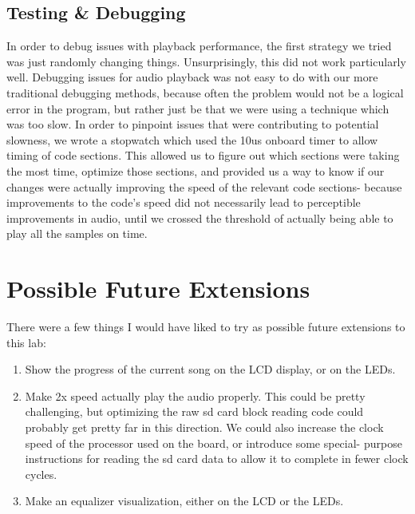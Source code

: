 \documentclass[12pt]{article}
\begin{document}
\subsection{Testing \& Debugging}
In order to debug issues with playback performance, the first strategy we
tried was just randomly changing things. Unsurprisingly, this did not work
particularly well. Debugging issues for audio playback was not easy to do
with our more traditional debugging methods, because often the problem would
not be a logical error in the program, but rather just be
that we were using a technique which was too slow. In order to pinpoint issues
that were contributing to potential slowness, we wrote a stopwatch which used
the 10us onboard timer to allow timing of code sections. This allowed us to
figure out which sections were taking the most time, optimize those sections,
and provided us a way to know if our changes were actually improving the speed
of the relevant code sections- because improvements to the code's speed did
not necessarily lead to perceptible improvements in audio, until we crossed
the threshold of actually being able to play all the samples on time.

\section{Possible Future Extensions}
There were a few things I would have liked to try as possible future extensions
to this lab:
\begin{enumerate}
\item Show the progress of the current song on the LCD display, or on the LEDs.
\item Make 2x speed actually play the audio properly. This could be pretty
	challenging, but optimizing the raw sd card block reading code could
	probably get pretty far in this direction. We could also increase the
	clock speed of the processor used on the board, or introduce some special-
	purpose instructions for reading the sd card data to allow it to complete
	in fewer clock cycles.
\item Make an equalizer visualization, either on the LCD or the LEDs.
\end{enumerate}
\end{document}
